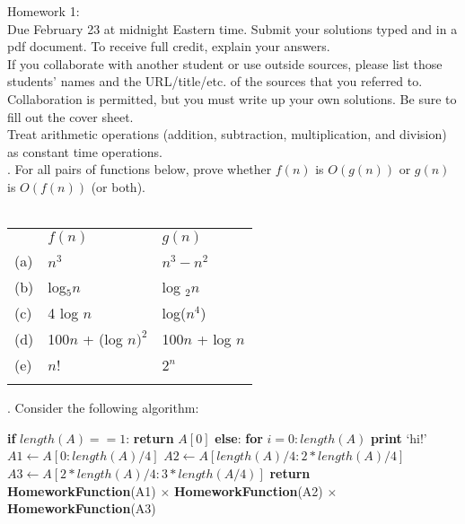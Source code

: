 \documentclass[12pt]{article}
\begin{document}
\noindent
\large Homework 1:\\
 \normalsize 
 \noindent
Due February 23 at midnight Eastern time.  Submit your solutions typed and in a pdf document.  To receive full credit, explain your answers.\\

\noindent
If you collaborate with another student or use outside sources, please list those students' names and the URL/title/etc. of the sources that you referred to.  Collaboration is permitted, but you must write up your own solutions.  Be sure to fill out the cover sheet.\\

\noindent
Treat arithmetic operations (addition, subtraction, multiplication, and division) as constant time operations.\\

.  For all pairs of functions below, prove whether $f(n)$ is $O(g(n))$ or $g(n)$ is $O(f(n))$ (or both). \\\\
\begin{tabular}{ l l l }
       & $f(n)$ & $g(n)$ \\
  (a) & $n^3$ & $n^3 - n^2$ \\
  (b) & log$_5n$ & log $_2n$\\
  (c) & 4 log $n$ & log($n^4$)\\
  (d) & 100$n$ + (log $n)^2$ & 100$n$ + log $n$\\
  (e) & $n$! & $2^n$\\ \\
\end{tabular} 

.  Consider the following algorithm: 
\begin{algorithm}
\begin{algorithmic}[1]
    \State \textbf{if} $length(A) == 1$:
    \State \hspace{0.8cm}  \textbf{return} $A[0]$
    \State \textbf{else}:
    \State \hspace{0.8cm} \textbf{for} $i = 0:length(A)$
    \State \hspace{1.6cm} \textbf{print} `hi!'
    \State \hspace{0.8cm} $A1\gets A[0:length(A)/4]$
    \State \hspace{0.8cm} $A2\gets A[length(A)/4:2*length(A)/4]$
    \State \hspace{0.8cm} $A3\gets A[2*length(A)/4:3*length(A/4)]$
    \State \hspace{0.8cm} \textbf{return HomeworkFunction}(A1) $\times$ \textbf{HomeworkFunction}(A2) $\times$ \textbf{HomeworkFunction}(A3)
\EndFunction
\end{algorithmic}
\end{algorithm}
\end{document}
